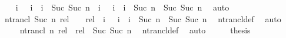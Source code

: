 \begin{isabellebody}
%
\isadelimproof
%
\endisadelimproof
%
\isatagproof
{}\isamarkupfalse%
{\isacharminus}{\kern0pt}\isanewline
\ \ \isamarkupfalse%
\ {\isachardoublequoteopen}{\isacharbraceleft}{\kern0pt}i{\isachardot}{\kern0pt}\ {}\ {\isacharless}{\kern0pt}\ i\ {\isasymand}\ i\ {\isasymle}\ Suc\ {\isacharparenleft}{\kern0pt}Suc\ n{\isacharparenright}{\kern0pt}{\isacharbraceright}{\kern0pt}\ {\isacharequal}{\kern0pt}\ {\isacharbraceleft}{\kern0pt}i{\isachardot}{\kern0pt}\ {}\ {\isacharless}{\kern0pt}\ i\ {\isasymand}\ i\ {\isasymle}\ Suc\ n{\isacharbraceright}{\kern0pt}\ {\isasymunion}\ {\isacharbraceleft}{\kern0pt}Suc\ {\isacharparenleft}{\kern0pt}Suc\ n{\isacharparenright}{\kern0pt}{\isacharbraceright}{\kern0pt}{\isachardoublequoteclose}\ \isamarkupfalse%
\ auto\isanewline
\ \ \isamarkupfalse%
\ \isamarkupfalse%
\ {\isachardoublequoteopen}ntrancl\ {\isacharparenleft}{\kern0pt}Suc\ n{\isacharparenright}{\kern0pt}\ rel\ {\isacharequal}{\kern0pt}\ {\isasymUnion}\ {\isacharparenleft}{\kern0pt}{\isacharparenleft}{\kern0pt}{\isacharcircum}{\kern0pt}{\isacharcircum}{\kern0pt}{\isacharparenright}{\kern0pt}\ rel\ {\isacharbackquote}{\kern0pt}\ {\isacharparenleft}{\kern0pt}{\isacharbraceleft}{\kern0pt}i{\isachardot}{\kern0pt}\ {}\ {\isacharless}{\kern0pt}\ i\ {\isasymand}\ i\ {\isasymle}\ Suc\ n{\isacharbraceright}{\kern0pt}\ {\isasymunion}\ {\isacharbraceleft}{\kern0pt}Suc\ {\isacharparenleft}{\kern0pt}Suc\ n{\isacharparenright}{\kern0pt}{\isacharbraceright}{\kern0pt}{\isacharparenright}{\kern0pt}{\isacharparenright}{\kern0pt}{\isachardoublequoteclose}\ \isamarkupfalse%
\ ntrancl{\isacharunderscore}{\kern0pt}def\ \isamarkupfalse%
\ auto\isanewline
\ \ \isamarkupfalse%
\ \isamarkupfalse%
\ {\isachardoublequoteopen}{\isasymdots}\ {\isacharequal}{\kern0pt}\ ntrancl\ n\ rel\ {\isasymunion}\ rel\ {\isacharcircum}{\kern0pt}{\isacharcircum}{\kern0pt}\ Suc\ {\isacharparenleft}{\kern0pt}Suc\ n{\isacharparenright}{\kern0pt}{\isachardoublequoteclose}\ \isamarkupfalse%
\ ntrancl{\isacharunderscore}{\kern0pt}def\ \isamarkupfalse%
\ auto\isanewline
\ \ \isamarkupfalse%
\ \isamarkupfalse%
\ {\isacharquery}{\kern0pt}thesis\ \isacommand{{\isachardot}{\kern0pt}}\isamarkupfalse%
\isanewline
{}\isamarkupfalse%
%
\endisatagproof
{\isafoldproof}%
%
\isadelimproof
\isanewline
%
\endisadelimproof
\isanewline
{}\isamarkupfalse%

\end{isabellebody}
